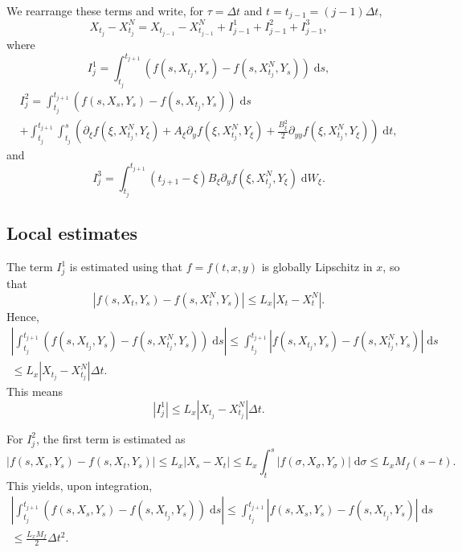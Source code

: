 \documentclass[reqno,12pt]{amsart}
\theoremstyle{plain}%
\theoremstyle{definition}
\begin{document}
We rearrange these terms and write, for $\tau = \Delta t$ and $t = t_{j-1} = (j-1)\Delta t$,
\begin{equation}
\label{stepexpression}
X_{t_j} - X_{t_j}^N  = X_{t_{j-1}} - X_{t_{j-1}}^N  + I_{j-1}^{1} + I_{j-1}^{2} + I_{j-1}^{3},
\end{equation}
where
$$
I_j^{1} = \int_{t_j}^{t_{j+1}} \left( f(s, X_{t_j}, Y_s) - f(s, X_{t_j}^N, Y_s) \right)\;\mathrm{d}s,
$$
\begin{multline*}
  I_j^2 =  \int_{t_j}^{t_{j+1}}  \left( f(s, X_s, Y_s) - f(s, X_{t_j}, Y_s) \right)\;\mathrm{d}s \\ 
 +  \int_{t_j}^{t_{j+1}} \int_{t_j}^s \left(\partial_\xi f(\xi, X_{t_j}^N, Y_\xi) + A_\xi \partial_y f(\xi, X_{t_j}^N, Y_\xi)  + \frac{B_\xi^2}{2}\partial_{yy}f(\xi, X_{t_j}^N, Y_\xi) \right) \;\mathrm{d}t,
\end{multline*}
and
$$
I_j^3 = \int_{t_j}^{t_{j+1}}  (t_{j+1} - \xi) B_\xi \partial_y f(\xi, X_{t_j}^N, Y_\xi) \;\mathrm{d}W_\xi.
$$

\subsection{Local estimates}

The term $I_j^1$ is estimated using that $f=f(t, x, y)$ is globally Lipschitz in $x$, so that
$$
\left| f(s, X_t, Y_s) - f(s, X_t^N, Y_s) \right| \leq L_x |X_t - X_t^N|.
$$
Hence,
\begin{multline*}
\left|  \int_{t_j}^{t_{j+1}} \left( f(s, X_{t_j}, Y_s) - f(s, X_{t_j}^N, Y_s)  \right) \;\mathrm{d}s \right| \leq   \int_{t_j}^{t_{j+1}} \left| f(s, X_{t_j}, Y_s) - f(s, X_{t_j}^N, Y_s)  \right| \;\mathrm{d} s \\ \leq L_x |X_{t_j} - X_{t_j}^N| \Delta t.
\end{multline*}
This means
\begin{equation}
\label{I1estimate}
\left| I_j^1 \right| \leq L_x |X_{t_j} - X_{t_j}^N| \Delta t.
\end{equation}

For $I_j^2$, the first term is estimated as
$$
\left| f(s, X_s, Y_s) - f(s, X_t, Y_s) \right| \leq L_x |X_s - X_t| \leq L_x \int_t^s |f(\sigma, X_\sigma, Y_\sigma)| \;\mathrm{d}\sigma \leq L_x M_f (s - t).
$$
This yields, upon integration,
\begin{multline*}
\left|  \int_{t_j}^{t_{j+1}} \left(f(s, X_s, Y_s) - f(s, X_{t_j}, Y_s) \right) \;\mathrm{d}s \right| \leq  \int_{t_j}^{t_{j+1}} \left| f(s, X_s, Y_s) - f(s, X_{t_j}, Y_s) \right| \;\mathrm{d} s \\
\leq \frac{L_x M_f}{2} \Delta t^2.
\end{multline*}
\end{document}
